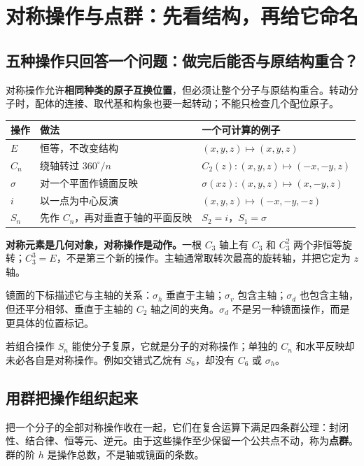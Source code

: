 \section{对称操作与点群：先看结构，再给它命名}

\subsection{五种操作只回答一个问题：做完后能否与原结构重合？}
对称操作允许\textbf{相同种类的原子互换位置}，但必须让整个分子与原结构重合。转动分子时，配体的连接、取代基和构象也要一起转动；不能只检查几个配位原子。

\begin{center}
\small
\begin{tabularx}{\linewidth}{@{}l l X@{}}
\toprule
操作 & 做法 & 一个可计算的例子 \\
\midrule
$E$ & 恒等，不改变结构 & $(x,y,z)\mapsto(x,y,z)$ \\
$C_n$ & 绕轴转过 $360^\circ/n$ & $C_2(z):(x,y,z)\mapsto(-x,-y,z)$ \\
$\sigma$ & 对一个平面作镜面反映 & $\sigma(xz):(x,y,z)\mapsto(x,-y,z)$ \\
$i$ & 以一点为中心反演 & $(x,y,z)\mapsto(-x,-y,-z)$ \\
$S_n$ & 先作 $C_n$，再对垂直于轴的平面反映 & $S_2=i$，$S_1=\sigma$ \\
\bottomrule
\end{tabularx}
\end{center}

\textbf{对称元素是几何对象，对称操作是动作。}一根 $C_3$ 轴上有 $C_3$ 和 $C_3^2$ 两个非恒等旋转；$C_3^3=E$，不是第三个新的操作。主轴通常取转次最高的旋转轴，并把它定为 $z$ 轴。

镜面的下标描述它与主轴的关系：$\sigma_h$ 垂直于主轴；$\sigma_v$ 包含主轴；$\sigma_d$ 也包含主轴，但还平分相邻、垂直于主轴的 $C_2$ 轴之间的夹角。$\sigma_d$ 不是另一种镜面操作，而是更具体的位置标记。

\begin{keyidea}[反轴不要求两个分步动作分别成立]
若组合操作 $S_n$ 能使分子复原，它就是分子的对称操作；单独的 $C_n$ 和水平反映却未必各自是对称操作。例如交错式乙烷有 $S_6$，却没有 $C_6$ 或 $\sigma_h$。
\end{keyidea}

\subsection{用群把操作组织起来}
把一个分子的全部对称操作收在一起，它们在复合运算下满足四条群公理：封闭性、结合律、恒等元、逆元。由于这些操作至少保留一个公共点不动，称为\textbf{点群}。群的阶 $h$ 是操作总数，不是轴或镜面的条数。

